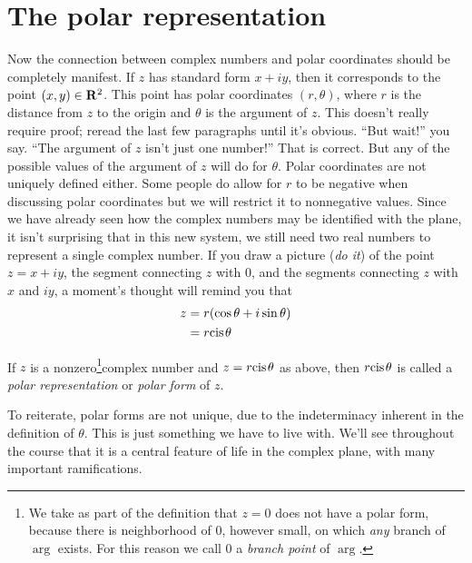 \documentclass[twocolumn,12pt]{article}
\begin{document}
\section{The polar representation}
Now the connection between complex numbers and polar coordinates should be completely manifest. If $z$ has standard form $x + iy$, then it corresponds to the point $(x,y) \in \mathbf{R}^2$. This point has polar coordinates $(r, \theta)$, where $r$ is the distance from $z$ to the origin and $\theta$ is the argument of $z$. This doesn't really require proof; reread the last few paragraphs until it's obvious. ``But wait!'' you say. ``The argument of $z$ isn't just one number!'' That is correct. But any of the possible values of the argument of $z$ will do for $\theta$. Polar coordinates are not uniquely defined either. Some people do allow for $r$ to be negative when discussing polar coordinates but we will restrict it to nonnegative values.
Since we have already seen how the complex numbers may be identified with the plane, it isn't surprising that in this new system, we still need two real numbers to represent a single complex number.
%
If you draw a picture (\emph{do it}) of the point $z = x + iy$, the segment connecting $z$ with $0$, and the segments connecting $z$ with $x$ and $iy$, a moment's thought will remind you that
  \begin{align*}
    z &= r(\cos \theta + i \sin \theta) \\
      &= r \cis{\theta} 
  \end{align*}
\begin{definition}
  If $z$ is a nonzero\footnote{We take as part of the definition that $z = 0$ does not have a polar form, because there is neighborhood of $0$, however small, on which \emph{any} branch of $\arg$ exists. For this reason we call $0$ a \emph{branch point} of $\arg$.}complex number and $z = r \cis{\theta}$ as above, then $r \cis{\theta}$ is called a \emph{polar representation} or \emph{polar form} of $z$.
\end{definition}
To reiterate, polar forms are not unique, due to the indeterminacy inherent in the definition of $\theta$. This is just something we have to live with. We'll see throughout the course that it is a central feature of life in the complex plane, with many important ramifications. 
\end{document}
